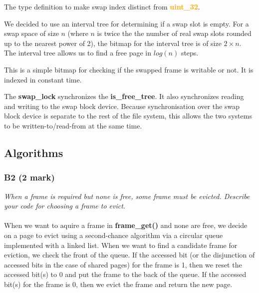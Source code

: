 \documentclass{report}
\newcommand{\question}[1]{\textit{#1} \ }
\newcommand{\fun}[1]{\textcolor{Emerald}{\textbf{#1}}}
\newcommand{\file}[1]{\textcolor{YellowGreen}{\textbf{#1}}}
\newcommand{\struct}[1]{\textcolor{orange}{\textbf{#1}}}
\newcommand{\var}[1]{\textcolor{RoyalPurple}{\textbf{#1}}}
\newcommand{\pintoscode}[4]{}
\newcommand{\pintosfile}[3]{\pintoscode{#1}{#2}{\file{#3}}{#3}}
\begin{document}
				\pintosfile{9}{9}{swap.h}
				The type definition to make swap index distinct from \struct{uint\_32}.
				
				\pintosfile{12}{12}{swap.c}
					We decided to use an interval tree for determining if a 
					swap slot is empty. For a swap space of size $n$ 
					(where $n$ is twice the the number of real swap slots
					rounded up to the nearest power of 2), the bitmap for the 
					interval tree is of size $2 \times n$. The interval tree 
					allows us to find a free page in $log(n)$ steps.
				
				\pintosfile{13}{13}{swap.c}
					This is a simple bitmap for checking if the swapped frame 
					is writable or not. It is indexed in constant time.

				\pintosfile{15}{15}{swap.c}
					The \var{swap\_lock} synchronizes the \var{is\_free\_tree}. 
					It also synchronizes reading and writing to the swap block 
					device. Because synchronisation over the swap block device 
					is separate to the rest of the file system, this allows the two 
					systems to be written-to/read-from at the same time.

		\subsection*{Algorithms}
			\subsubsection*{B2 (2 mark)}
				\question{When a frame is required but none is free, some frame 
				must be evicted. Describe your code for choosing a frame to 
				evict.}
				\\
				\\ When we want to aquire a frame in \fun{frame\_get()} and none
				are free, we decide on a page to evict using a second-chance 
				algorithm via a circular queue implemented with a linked list. 
				When we want to find a candidate frame for eviction, we check the
				front of the queue. If the accessed bit (or the disjunction of
				accessed bits in the case of shared pages) for the frame is 1,
				then we reset the accessed bit(s) to 0 and put the frame to the back
				of the queue. If the accessed bit(s) for the frame is 0, then we evict
				the frame and return the new page.
			
\end{document}
